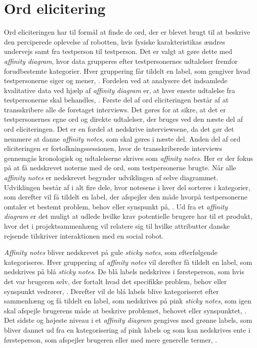 \section*{Ord elicitering}
\label{OrdElicitering}
%
Ord eliciteringen har til formål at finde de ord, der er blevet brugt til at beskrive den perciperede oplevelse af robotten, hvis fysiske karakteristikas ændres undervejs samt fra testperson til testperson. Det er valgt at gøre dette med \textit{affinity diagram}, hvor data grupperes efter testpersonernes udtalelser fremfor forudbestemte kategorier. Hver gruppering får tildelt en label, som gengiver hvad testpersonerne siger og mener, \parencite[s. 159]{Book:BuildingAnAffinity}. Fordelen ved at analysere det indsamlede kvalitative data ved hjælp af \textit{affinity diagram} er, at hver eneste udtalelse fra testpersonerne skal behandles, \parencite[s. 25]{PDF:ConsolidationIdeationAffinity}. \blankline
%
Første del af ord eliciteringen består af at transskribere alle de foretaget interviews. Det gøres for at sikre, at det er testpersonernes egne ord og direkte udtalelser, der bruges ved den næste del af ord eliciteringen. Det er en fordel at nedskrive interviewsene, da det gør det nemmere at danne \textit{affinity notes}, som skal gøres i næste del. \blankline
%
Anden del af ord eliciteringen er fortolkningssessionen, hvor de transskriberede interviews gennemgås kronologisk og udtalelserne skrives som \textit{affinity notes}. Her er der fokus på at få nedskrevet noterne med de ord, som testpersonerne brugte. \blankline
%
Når alle \textit{affinity notes} er nedskrevet begynder udviklingen af selve diagrammet. Udviklingen består af i alt fire dele, hvor notesene i hver del sorteres i kategorier, som derefter vil få tildelt en label, der afspejler den måde hvorpå testpersonerne omtaler et bestemt problem, behov eller synspunkt på, \parencite[s. 159]{Book:BuildingAnAffinity}. Ud fra et \textit{affinity diagram} er det muligt at udlede hvilke krav potentielle brugere har til et produkt, hvor det i projektsammenhæng vil relatere sig til hvilke attributter danske rejsende tilskriver interaktionen med en social robot. 

\textit{Affinity notes} bliver nedskrevet på gule \textit{sticky notes}, som efterfølgende kategoriseres. Hver gruppering af \textit{affinity notes} vil derefter få tildelt en label, som nedskrives på blå \textit{sticky notes}. De blå labels nedskrives i førsteperson, som hvis det var brugeren selv, der fortalt hvad det specifikke problem, behov eller synspunkt vedrører, \parencite[s. 160]{Book:BuildingAnAffinity}. Derefter vil de blå labels blive kategoriseret efter sammenhæng og få tildelt en label, som nedskrives på pink \textit{sticky notes}, som igen skal afspejle brugerens måde at beskrive problemet, behovet eller synspunktet, \parencite[s. 160]{Book:BuildingAnAffinity}. Det sidste og højeste niveau i et \textit{affinity diagram} gengives med grønne labels, som bliver dannet ud fra en kategorisering af pink labels og som kan nedskrives ente i førsteperson, som afspejler brugeren eller med mere generelle termer, \parencite[s. 160]{Book:BuildingAnAffinity}. 
%






